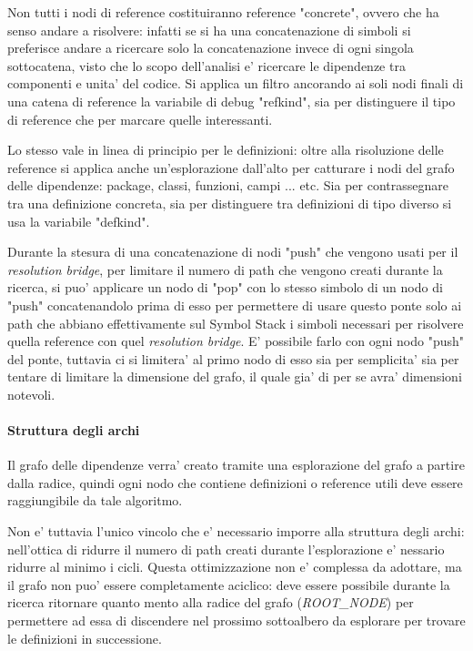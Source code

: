 Non tutti i nodi di reference costituiranno reference "concrete", ovvero che ha senso andare a risolvere: infatti se si ha una concatenazione di simboli si preferisce andare a ricercare solo la concatenazione invece di ogni singola sottocatena, visto che lo scopo dell'analisi e' ricercare le dipendenze tra componenti e unita' del codice. Si applica un filtro ancorando ai soli nodi finali di una catena di reference la variabile di debug "refkind", sia per distinguere il tipo di reference che per marcare quelle interessanti.

Lo stesso vale in linea di principio per le definizioni: oltre alla risoluzione delle reference si applica anche un'esplorazione dall'alto per catturare i nodi del grafo delle dipendenze: package, classi, funzioni, campi ... etc. Sia per contrassegnare tra una definizione concreta, sia per distinguere tra definizioni di tipo diverso si usa la variabile "defkind".

Durante la stesura di una concatenazione di nodi "push" che vengono usati per il \emph{resolution bridge}, per limitare il numero di path che vengono creati durante la ricerca, si puo' applicare un nodo di "pop" con lo stesso simbolo di un nodo di "push" concatenandolo prima di esso per permettere di usare questo ponte solo ai path che abbiano effettivamente sul Symbol Stack i simboli necessari per risolvere quella reference con quel \emph{resolution bridge}.
E' possibile farlo con ogni nodo "push" del ponte, tuttavia ci si limitera' al primo nodo di esso sia per semplicita' sia per tentare di limitare la dimensione del grafo, il quale gia' di per se avra' dimensioni notevoli.

\paragraph{Struttura degli archi}

Il grafo delle dipendenze verra' creato tramite una esplorazione del grafo a partire dalla radice, quindi ogni nodo che contiene definizioni o reference utili deve essere raggiungibile da tale algoritmo.

Non e' tuttavia l'unico vincolo che e' necessario imporre alla struttura degli archi: nell'ottica di ridurre il numero di path creati durante l'esplorazione e' nessario ridurre al minimo i cicli.
Questa ottimizzazione non e' complessa da adottare, ma il grafo non puo' essere completamente aciclico: deve essere possibile durante la ricerca ritornare quanto mento alla radice del grafo (\emph{ROOT\_NODE}) per permettere ad essa di discendere nel prossimo sottoalbero da esplorare per trovare le definizioni in successione.

